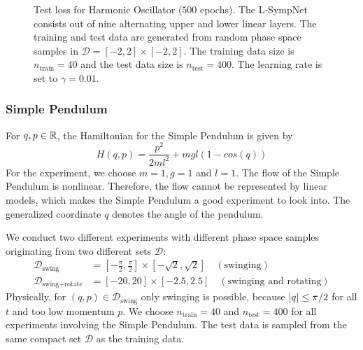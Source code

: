 \documentclass[twoside,a4paper]{article}
\begin{document}
\begin{figure}
\centering
{}
\caption{Test loss for Harmonic Oscillator ($500$ epochs). The L-SympNet consists out of nine alternating upper and 
lower linear layers. The training and test data are generated from random phase space samples in 
$\mathcal{D} = [-2,2] \times [-2,2]$. The training data size is $n_{\text{train}} = 40$
and the test data size is $n_{\text{test}}=400$.
The learning rate is set to $\gamma = 0.01$.}\label{fig_harm_osc_loss}
\end{figure}

\subsubsection{Simple Pendulum}

For $q,p \in \mathbb{R}$, the Hamiltonian for the Simple Pendulum is given by
\begin{equation*}
	H(q,p) = \frac{p^2}{2ml^2} + mgl (1-cos(q))
\end{equation*}
For the experiment, we choose $m=1, g=1$ and $l=1$. The flow of the Simple Pendulum is nonlinear.
Therefore, the flow cannot be represented by linear models, which makes the Simple Pendulum
a good experiment to look into. The generalized coordinate $q$ denotes the angle of the pendulum.

We conduct two different experiments with different
phase space samples originating from two different sets $\mathcal{D}$:
\begin{align*}
	\mathcal{D}_{\text{swing}} &= [-\frac{\pi}{2}, \frac{\pi}{2}] \times [-\sqrt{2}, \sqrt{2}]
	\quad (\text{swinging}) \\
	\mathcal{D}_{\text{swing+rotate}} &= [-20, 20] \times [-2.5, 2.5]
	\quad (\text{swinging and rotating})
\end{align*}
Physically, for $(q,p) \in \mathcal{D}_{\text{swing}}$ only swinging is possible,
because $\left|{q}\right| \leq \pi/2$ for all $t$ and too low momentum $p$.
We choose $n_{\text{train}} = 40$ and $n_{\text{test}} = 400$ for all experiments involving
the Simple Pendulum. The test data is sampled from the same compact set $\mathcal{D}$ as the training data.
\end{document}
